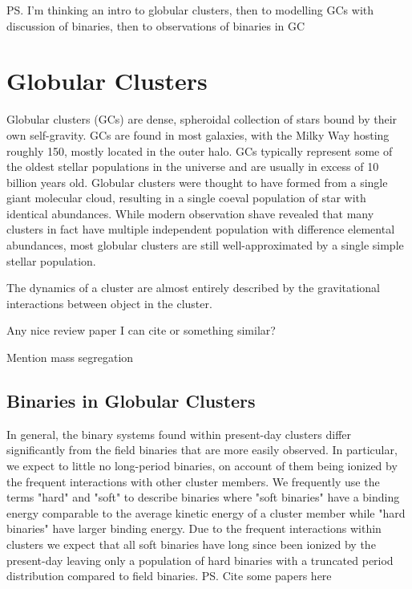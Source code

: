 








\ps{I'm thinking an intro to globular clusters, then to modelling GCs with discussion of binaries,
	then to observations of binaries in GC}

\section{Globular Clusters}

Globular clusters (GCs) are dense, spheroidal collection of stars bound by their own self-gravity.
GCs are found in most galaxies, with the Milky Way hosting roughly 150, mostly located in the outer
halo. GCs typically represent some of the oldest stellar populations in the universe and are usually
in excess of 10 billion years old. Globular clusters were thought to have formed from a single giant
molecular cloud, resulting in a single coeval population of star with identical abundances. While
modern observation shave revealed that many clusters in fact have multiple independent population
with difference elemental abundances, most globular clusters are still well-approximated by a single
simple stellar population.

The dynamics of a cluster are almost entirely described by the gravitational interactions between
object in the cluster.

Any nice review paper I can cite or something similar?

Mention mass segregation

\subsection{Binaries in Globular Clusters}


In general, the binary systems found within present-day clusters differ significantly from the field
binaries that are more easily observed. In particular, we expect to little no long-period binaries,
on account of them being ionized by the frequent interactions with other cluster members. We
frequently use the terms "hard" and "soft" to describe binaries where "soft binaries" have a binding
energy comparable to the average kinetic energy of a cluster member while "hard binaries" have
larger binding energy. Due to the frequent interactions within clusters we expect that all soft
binaries have long since been ionized by the present-day leaving only a population of hard binaries
with a truncated period distribution compared to field binaries.
\ps{Cite some papers here}

